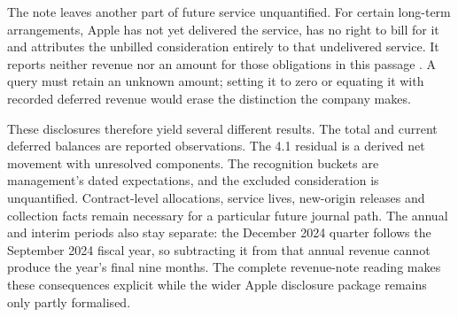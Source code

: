 The note leaves another part of future service unquantified. For certain
long-term arrangements, Apple has not yet delivered the service, has no right
to bill for it and attributes the unbilled consideration entirely to that
undelivered service. It reports neither revenue nor an amount for those
obligations in this passage \citep[Note 2, printed p.~35]{apple2024}. A query
must retain an unknown amount; setting it to zero or equating it with recorded
deferred revenue would erase the distinction the company makes.

These disclosures therefore yield several different results. The total and
current deferred balances are reported observations. The 4.1 residual is a
derived net movement with unresolved components. The recognition buckets are
management's dated expectations, and the excluded consideration is unquantified.
Contract-level allocations, service lives, new-origin releases and collection
facts remain necessary for a particular future journal path. The annual and
interim periods also stay separate: the December 2024 quarter follows the
September 2024 fiscal year, so subtracting it from that annual revenue cannot
produce the year's final nine months. The complete revenue-note reading makes
these consequences explicit while the wider Apple disclosure package remains
only partly formalised.
